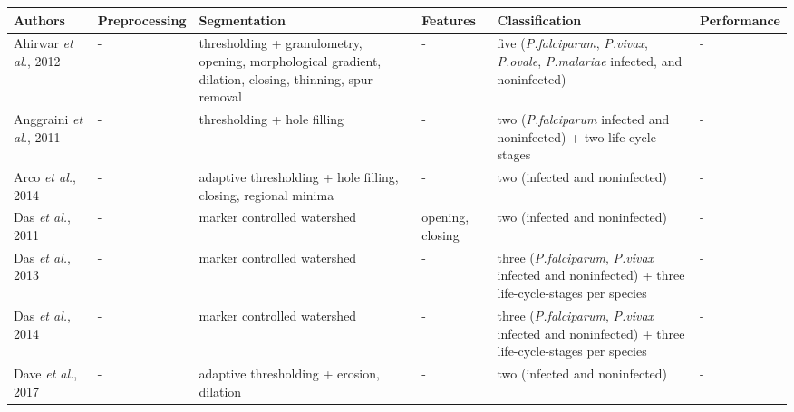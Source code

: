 	\setlength\LTleft{-0.75in}
\footnotesize
    \begin{longtable}{C{2.1cm} C{2.1cm} C{2.3cm} C{1.5cm} C{2.7cm} C{2.2cm} }

		\hline
    	\textbf{Authors} & \textbf{Preprocessing} & \textbf{Segmentation} & \textbf{Features} & \textbf{Classification} & \textbf{Performance}  \\[1pt] \hline

    Ahirwar \emph{et al.}, 2012  &
    	- &
    	thresholding + granulometry, opening, morphological gradient, dilation, closing, thinning, spur removal &
    	- &
    	five (\emph{P.falciparum}, \emph{P.vivax}, \emph{P.ovale}, \emph{P.malariae} infected, and noninfected) &
    	- \vspace{0.6cm} \\

    Anggraini \emph{et al.}, 2011 &
		- &
		thresholding + hole filling &	
		- &
		two (\emph{P.falciparum} infected and noninfected) + two life-cycle-stages &
		-
        \vspace{0.6cm}
		\\
    Arco \emph{et al.}, 2014 &
		- &
		adaptive thresholding + hole filling, closing, regional minima &	
		- &
		two (infected and noninfected) &
		-
		\vspace{0.6cm}
        \\
    Das \emph{et al.}, 2011 &
		- &
		marker controlled watershed &	
		opening, closing  &
		two (infected and noninfected) &
		-
		\vspace{0.6cm}
        \\
        
    Das \emph{et al.}, 2013 &
		- &
		marker controlled watershed &	
		- &
		three (\emph{P.falciparum}, \emph{P.vivax} infected and noninfected) + three life-cycle-stages per species &
		-
		\vspace{0.6cm}
        \\    
        
    Das \emph{et al.}, 2014 &
		- &
		marker controlled watershed &	
		- &
		three (\emph{P.falciparum}, \emph{P.vivax} infected and noninfected) + three life-cycle-stages per species &
		-
		\vspace{0.6cm}
        \\
                       
    Dave \emph{et al.}, 2017 &
		- &
		adaptive thresholding + erosion, dilation &	
		- &
		two (infected and noninfected) &
		-
		\vspace{0.6cm}
        \\           
        

\end{longtable}
